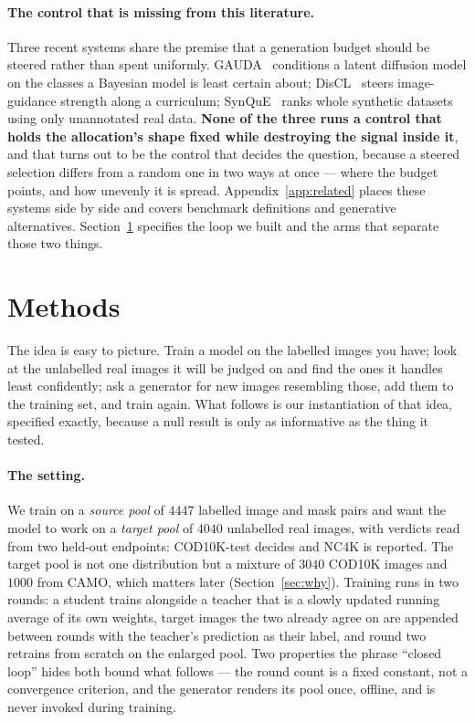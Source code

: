 \documentclass{article} %
\begin{document}
\paragraph{The control that is missing from this literature.} Three recent systems share the premise
that a generation budget should be steered rather than spent uniformly.
GAUDA~\citep{frisch2025gauda} conditions a latent diffusion model on the classes a Bayesian model is
least certain about; DisCL~\citep{liang2025discl} steers image-guidance strength along a curriculum;
SynQuE~\citep{chen2025synque} ranks whole synthetic datasets using only unannotated real data.
\textbf{None of the three runs a control that holds the allocation's shape fixed while destroying
the signal inside it}, and that turns out to be the control that decides the question, because a
steered selection differs from a random one in two ways at once --- where the budget points, and how
unevenly it is spread. Appendix~\ref{app:related} places these systems side by side and covers
benchmark definitions and generative alternatives. Section~\ref{sec:method} specifies the loop we
built and the arms that separate those two things.

\section{Methods}
\label{sec:method}
The idea is easy to picture. Train a model on the labelled images you have; look at the unlabelled
real images it will be judged on and find the ones it handles least confidently; ask a generator for
new images resembling those, add them to the training set, and train again. What follows is our
instantiation of that idea, specified exactly, because a null result is only as informative as the
thing it tested.

\paragraph{The setting.} We train on a \emph{source pool} of $4447$ labelled image and mask pairs
and want the model to work on a \emph{target pool} of $4040$ unlabelled real images, with verdicts
read from two held-out endpoints: COD10K-test decides and NC4K is reported. The target pool is not
one distribution but a mixture of $3040$ COD10K images and $1000$ from CAMO, which matters later
(Section~\ref{sec:why}). Training runs in two rounds: a student trains alongside a teacher that is a slowly updated running
average of its own weights, target images the two already agree on are appended between rounds with
the teacher's prediction as their label, and round two retrains from scratch on the enlarged pool.
Two properties the phrase ``closed loop'' hides both bound what follows --- the round count is a
fixed constant, not a convergence criterion, and the generator renders its pool once, offline, and
is never invoked during training.
\end{document}
